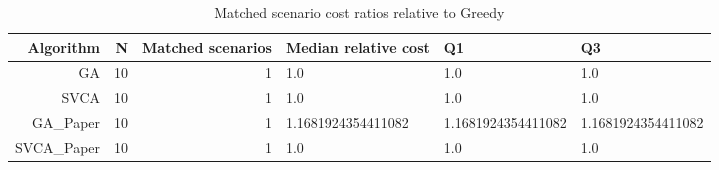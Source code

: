 \begin{table}[htbp]
\centering
\small
\caption{Matched scenario cost ratios relative to Greedy}
\label{tab:research_smoke_c1_r1_20261122_paired_cost}
\begin{tabular}{rrrlll}
\hline
Algorithm & N & Matched scenarios & Median relative cost & Q1 & Q3 \\
\hline
GA & 10 & 1 & 1.0 & 1.0 & 1.0 \\
SVCA & 10 & 1 & 1.0 & 1.0 & 1.0 \\
GA\_Paper & 10 & 1 & 1.1681924354411082 & 1.1681924354411082 & 1.1681924354411082 \\
SVCA\_Paper & 10 & 1 & 1.0 & 1.0 & 1.0 \\
\hline
\end{tabular}
\end{table}
